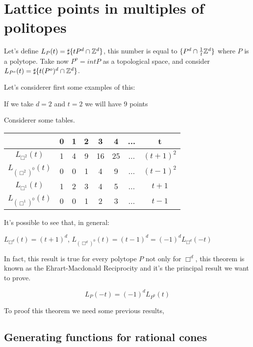 \chapter{Lattice points in multiples of politopes}


Let's define $L_P(t)= \sharp \{tP^{d} \cap \mathbb{Z} ^{d} \}$, this number is equal to $\{P^{d} \cap \frac{1}{t} \mathbb{Z} ^{d}\}$ where $P$ is a polytope.
Take now $P^{o}=int P$ as a topological space, and consider $L_{P^{o}}(t)= \sharp \{t(P^{o})^{d} \cap \mathbb{Z} ^{d} \}$.

Let's considerer first some examples of this:

If we take $d=2$ and $t=2$ we will have $9$ points

Considerer some tables.

\begin{table}[ht]
\centering
\begin{tabular}{c|c|c|c|c|c|c|c}
 & 0 & 1 & 2 & 3 & 4 & ... & t \\
 \hline
$L_{\Box^2}(t)$ & 1 & 4 & 9 & 16 & 25 & ... & $(t+1)^{2}$\\
\hline
$L_{(\Box^2)^0}(t)$  & 0 & 0 & 1 & 4 & 9 & ... & $(t-1)^{2}$\\
\hline
$L_{\Box^1}(t)$ & 1 & 2 & 3 & 4 & 5 & ... & $t+1$ \\
\hline
$L_{(\Box^1)^0}(t)$ & 0 & 0 & 1 & 2 & 3 & ... & $t-1$ \\
\end{tabular}
\end{table}

It's possible to see that, in general:

\begin{theorem}
$L_{\Box^d}(t) = (t+1)^{d}$, $L_{(\Box^d)^0}(t)=(t-1)^{d}=(-1)^{d}L_{\Box^d}(-t)$
\end{theorem}

In fact, this result is true for every polytope $P$ not only for $\Box^d$, this theorem is known as the Ehrart-Macdonald Reciprocity and it's the principal result we want to prove.

\begin{theorem}
\[
  L_P(-t) = (-1)^d L_{P^0}(t)
\]
\end{theorem}

To proof this theorem we need some previous results,

\section{Generating functions for rational cones}

